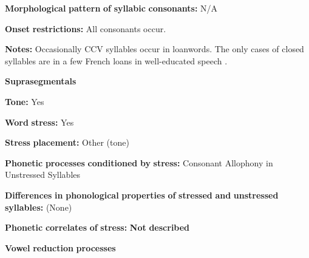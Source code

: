 \begin{styleBody}
\textbf{Morphological} \textbf{pattern} \textbf{of} \textbf{syllabic} \textbf{consonants:} N/A
\end{styleBody}

\begin{styleBody}
\textbf{Onset} \textbf{restrictions:} All consonants occur.
\end{styleBody}

\begin{styleBody}
\textbf{Notes:} Occasionally CCV syllables occur in loanwords. The only cases of closed syllables are in a few French loans in well-educated speech \citep[113]{Morse1976}.
\end{styleBody}

\begin{styleBody}
\textbf{Suprasegmentals}
\end{styleBody}

\begin{styleBody}
\textbf{Tone:} Yes
\end{styleBody}

\begin{styleBody}
\textbf{Word} \textbf{stress:} Yes
\end{styleBody}

\begin{styleBody}
\textbf{Stress} \textbf{placement:} Other (tone)
\end{styleBody}

\begin{styleBody}
\textbf{Phonetic} \textbf{processes} \textbf{conditioned} \textbf{by} \textbf{stress:} Consonant Allophony in Unstressed Syllables
\end{styleBody}

\begin{styleBody}
\textbf{Differences} \textbf{in} \textbf{phonological} \textbf{properties} \textbf{of} \textbf{stressed} \textbf{and} \textbf{unstressed} \textbf{syllables:} (None)
\end{styleBody}

\begin{styleBody}
\textbf{Phonetic} \textbf{correlates} \textbf{of} \textbf{stress:} \textbf{Not} \textbf{described}
\end{styleBody}

\begin{styleBody}
\textbf{Vowel} \textbf{reduction} \textbf{processes}
\end{styleBody}

